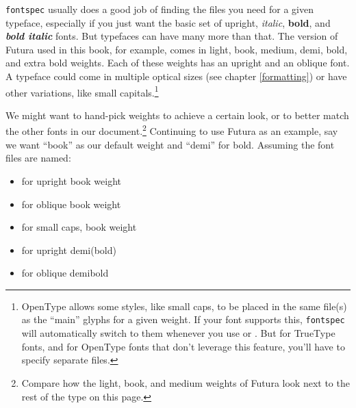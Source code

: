\texttt{fontspec} usually does a good job of finding
the files you need for a given typeface,
especially if you just want the basic set of
upright,
\textit{italic},
\textbf{bold}, and
\textit{\textbf{bold italic}} fonts.
But typefaces can have many more than that.
The version of Futura used in this book, for example, comes in
{light},
{book},
{medium},
{demi},
{bold}, and
{extra bold} weights.
Each of these weights has an upright and an oblique font.
A typeface could come in multiple optical sizes (see chapter \ref{formatting})
or have other variations, like
{small capitals}.\punckern\footnote{%
OpenType allows some styles, like small caps, to be placed in the same file(s)
as the ``main'' glyphs for a given weight.
If your font supports this, \texttt{fontspec}
will automatically switch to them whenever you use
 or .
But for TrueType fonts,
and for OpenType fonts that don't leverage this feature,
you'll have to specify separate files.}

We might want to hand-pick weights to achieve a certain look,
or to better match the
other fonts in our document.\punckern\footnote{Compare how
{the light,}
{book,}
{and medium weights}
of Futura look next to the rest of the type on this page.}
Continuing to use Futura as an example,
say we want ``book'' as our default weight
and ``demi'' for bold.
Assuming the font files are named:
\begin{itemize}
\item {} for
    {upright book weight}
\item {} for
    {oblique book weight}
\item {} for
    {small caps, book weight}
\item {} for
    {upright demi(bold)}
\item {} for
    {oblique demibold}
\end{itemize}

